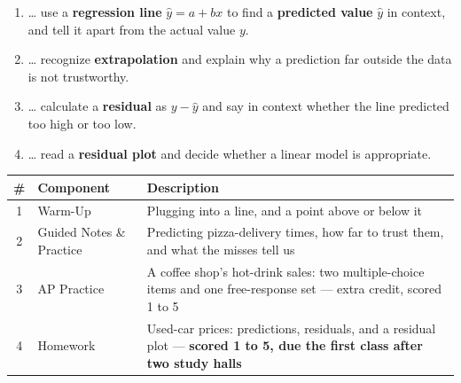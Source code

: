 \documentclass[12pt]{article}
\begin{document}

\namedateperiod
\vspace{0.18in}

\boxguard[14]
\begin{learningtargetbox}
\small
\begin{enumerate}[leftmargin=1.5em, itemsep=5pt]
  \item \ldots{} use a \textbf{regression line} $\hat{y} = a + bx$ to find a
        \textbf{predicted value} $\hat{y}$ in context, and tell it apart from the actual
        value $y$.
  \item \ldots{} recognize \textbf{extrapolation} and explain why a prediction far outside the
        data is not trustworthy.
  \item \ldots{} calculate a \textbf{residual} as $y - \hat{y}$ and say in context whether the
        line predicted too high or too low.
  \item \ldots{} read a \textbf{residual plot} and decide whether a linear model is
        appropriate.
\end{enumerate}
\end{learningtargetbox}

\vspace{0.14in}

\boxguard[14]
\begin{tocbox}
\small
\renewcommand{\arraystretch}{1.5}
\begin{tabularx}{\linewidth}{@{} c l X @{}}
\rowcolor{sky}
\textbf{\#} & \textbf{Component} & \textbf{Description} \\
\midrule
1 & Warm-Up & Plugging into a line, and a point above or below it \\
2 & Guided Notes \& Practice & Predicting pizza-delivery times, how far to trust them, and
                 what the misses tell us \\
3 & AP Practice & A coffee shop's hot-drink sales: two multiple-choice items and one
                 free-response set --- extra credit, scored 1 to 5 \\
4 & Homework & Used-car prices: predictions, residuals, and a residual plot ---
                 \textbf{scored 1 to 5, due the first class after two study halls} \\
\end{tabularx}
\end{tocbox}
\end{document}
